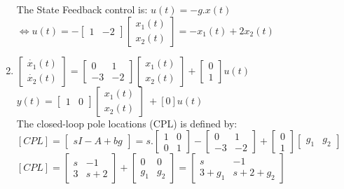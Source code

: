 \documentclass[14pt,a4paper]{article}
\begin{document}
\begin{enumerate}
		The State Feedback control is: $u(t) = -g.x(t) $\\
		\hspace*{1cm} $\Leftrightarrow u(t) = -\begin{bmatrix} 1&-2 \end{bmatrix} \begin{bmatrix} x_1(t)\\x_2(t) \end{bmatrix} = -x_1(t) + 2x_2(t)$ \\
		
	\item
		$\begin{bmatrix}\dot{x_1}(t)\\ \dot{x_2}(t) \end{bmatrix} = \begin{bmatrix} 0 & 1 \\ -3&-2 \end{bmatrix} \begin{bmatrix}x_1(t) \\ x_2(t) \end{bmatrix} + \begin{bmatrix} 0\\1 \end{bmatrix}u(t)$ \\
		
		\hspace*{0.6cm} $y(t) = \begin{bmatrix} 1&0 \end{bmatrix} \begin{bmatrix} x_1(t)\\x_2(t) \end{bmatrix}\ + [0]u(t) $\\
	
		The closed-loop pole locations (CPL) is defined by:\\
		$[CPL] = \begin{bmatrix} sI-A+bg \end{bmatrix} = s.\begin{bmatrix}1&0\\0&1 \end{bmatrix} - \begin{bmatrix}0&1 \\-3&-2 \end{bmatrix} +  \begin{bmatrix} 0\\1 \end{bmatrix} \begin{bmatrix} g_1 & g_2 \end{bmatrix}$\\[0.2cm]
		$[CPL] = \begin{bmatrix}s&-1 \\ 3&s+2 \end{bmatrix} + \begin{bmatrix} 0 & 0  \\g_1 & g_2\end{bmatrix} = \begin{bmatrix}s&-1 \\3+g_1&s+2+g_2 \end{bmatrix} $\\
		

\end{enumerate}
\end{document}
